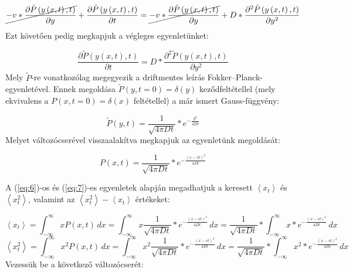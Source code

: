 \hrulefill
\begin{equation} \label{eq:31}
    \cancel{-v * \frac{\partial \tilde{P} \left( y \left( x, t \right), t \right)}{\partial y}}
    +
    \frac{\partial \tilde{P} \left( y \left( x, t \right), t \right)}{\partial t}
    =
    \cancel{-
    v * \frac{\partial \tilde{P} \left( y \left( x, t \right), t \right)}{\partial y}}
    +
    D * \frac{\partial^{2} \tilde{P} \left( y \left( x, t \right), t \right)}{\partial y^{2}}
\end{equation}
Ezt követően pedig megkapjuk a végleges egyenletünket:

\begin{equation} \label{eq:32}
    \frac{\partial \tilde{P} \left( y \left( x, t \right), t \right)}{\partial t}
    =
    D * \frac{\partial^{2} \tilde{P} \left( y \left( x, t \right), t \right)}{\partial y^{2}}
\end{equation}
Mely $\tilde{P}$-re vonatkozólag megegyezik a driftmentes leírás Fokker--Planck-egyenletével. Ennek megoldása $\tilde{P} \left( y, t = 0 \right) = \delta \left( y \right)$ keződfeltétellel (mely ekvivalens a $P \left( x, t = 0 \right) = \delta \left( x \right)$ feltétellel) a már ismert Gauss-függvény:

\begin{equation} \label{eq:33}
    \tilde{P} \left( y, t \right) = \frac{1}{\sqrt{4 \pi D t}} * e^{-\tfrac{y^{2}}{4Dt}}
\end{equation}
Melyet változócserével visszaalakítva megkapjuk az egyenletünk megoldását:

\begin{equation} \label{eq:34}
    \boxed{P \left( x, t \right) = \frac{1}{\sqrt{4 \pi D t}} * e^{-\tfrac{\left( x - vt \right)^{2}}{4Dt}}}
\end{equation}

A (\ref{eq:6})-os és (\ref{eq:7})-es egyenletek alapján megadhatjuk a keresett $\left< x_{t} \right>$ és $\left< x_{t}^{2} \right>$, valamint az $\left< x_{t}^{2} \right> - \left< x_{t} \right>$ értékeket:

\begin{equation} \label{eq:35}
    \left< x_{t} \right>
    =
    \int_{- \infty}^{\infty} x P \left( x, t \right)\, dx
    =
    \int_{- \infty}^{\infty} x \frac{1}{\sqrt{4 \pi D t}} * e^{-\tfrac{\left( x - vt \right)^{2}}{4Dt}}\, dx
    =
    \frac{1}{\sqrt{4 \pi D t}} * \int_{- \infty}^{\infty} x * e^{-\tfrac{\left( x - vt \right)^{2}}{4Dt}}\, dx
\end{equation}
\begin{equation} \label{eq:36}
    \left< x_{t}^{2} \right>
    =
    \int_{- \infty}^{\infty} x^{2} P \left( x, t \right)\, dx
    =
    \int_{- \infty}^{\infty} x^{2} \frac{1}{\sqrt{4 \pi D t}} * e^{-\tfrac{\left( x - vt \right)^{2}}{4Dt}}\, dx
    =
    \frac{1}{\sqrt{4 \pi D t}} * \int_{- \infty}^{\infty} x^{2} * e^{-\tfrac{\left( x - vt \right)^{2}}{4Dt}}\, dx
\end{equation}
Vezessük be a következő változócserét:

